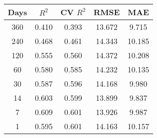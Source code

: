 \begin{tabular}{||c c c c c||}
\hline
Days & $R^2$ & CV $R^2$ & RMSE & MAE \\
\hline\hline
360 & 0.410 & 0.393 & 13.672 & 9.715 \\
240 & 0.468 & 0.461 & 14.343 & 10.185 \\
120 & 0.555 & 0.560 & 14.372 & 10.208 \\
60 & 0.580 & 0.585 & 14.232 & 10.135 \\
30 & 0.587 & 0.596 & 14.168 & 9.980 \\
14 & 0.603 & 0.599 & 13.899 & 9.837 \\
7 & 0.609 & 0.601 & 13.926 & 9.987 \\
1 & 0.595 & 0.601 & 14.163 & 10.157 \\
\hline
\end{tabular}

